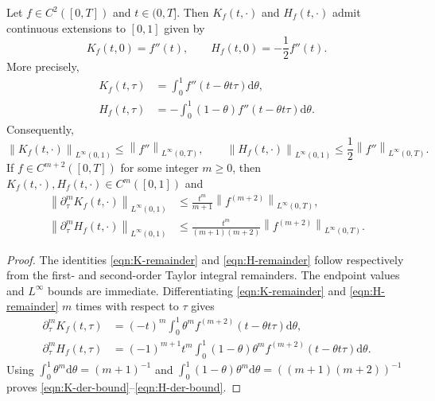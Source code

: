 \documentclass[preprint,3p,times]{elsarticle}
\newcommand{\norm}[1]{\left\lVert #1\right\rVert}
\def\d{\mathrm{d}}
\begin{document}
\begin{lemma}
\label{lem:type-kernels}
Let $f\in C^2([0,T])$ and $t\in(0,T]$. Then $K_f(t,\cdot)$ and $H_f(t,\cdot)$ admit continuous extensions to $[0,1]$ given by
\begin{equation}\label{eqn:K-H-zero}
    K_f(t,0)=f''(t),
    \qquad
    H_f(t,0)=-\frac12 f''(t).
\end{equation}
More precisely,
\begin{align}
    K_f(t,\tau)
    &=\int_0^1 f''(t-\theta t\tau)\d\theta,\label{eqn:K-remainder}\\
    H_f(t,\tau)
    &=-\int_0^1(1-\theta)f''(t-\theta t\tau)\d\theta.\label{eqn:H-remainder}
\end{align}
Consequently,
\begin{equation}\label{eqn:kernel-linf}
    \norm{K_f(t,\cdot)}_{L^\infty(0,1)}\le \norm{f''}_{L^\infty(0,T)},
    \qquad
    \norm{H_f(t,\cdot)}_{L^\infty(0,1)}\le \frac12\norm{f''}_{L^\infty(0,T)}.
\end{equation}
If $f\in C^{m+2}([0,T])$ for some integer $m\ge0$, then $K_f(t,\cdot),H_f(t,\cdot)\in C^m([0,1])$ and
\begin{align}
    \norm{\partial_\tau^m K_f(t,\cdot)}_{L^\infty(0,1)}
    &\le \frac{t^m}{m+1}\norm{f^{(m+2)}}_{L^\infty(0,T)},\label{eqn:K-der-bound}\\
    \norm{\partial_\tau^m H_f(t,\cdot)}_{L^\infty(0,1)}
    &\le \frac{t^m}{(m+1)(m+2)}\norm{f^{(m+2)}}_{L^\infty(0,T)}.\label{eqn:H-der-bound}
\end{align}
\end{lemma}

\begin{proof}
The identities \eqref{eqn:K-remainder} and \eqref{eqn:H-remainder} follow respectively from the first- and second-order Taylor integral remainders. The endpoint values and $L^\infty$ bounds are immediate. Differentiating \eqref{eqn:K-remainder} and \eqref{eqn:H-remainder} $m$ times with respect to $\tau$ gives
\begin{align*}
    \partial_\tau^mK_f(t,\tau)
    &=(-t)^m\int_0^1\theta^m f^{(m+2)}(t-\theta t\tau)\d\theta,\\
    \partial_\tau^mH_f(t,\tau)
    &=(-1)^{m+1}t^m\int_0^1(1-\theta)\theta^m f^{(m+2)}(t-\theta t\tau)\d\theta .
\end{align*}
Using $\int_0^1\theta^m\d\theta=(m+1)^{-1}$ and $\int_0^1(1-\theta)\theta^m\d\theta=((m+1)(m+2))^{-1}$ proves \eqref{eqn:K-der-bound}--\eqref{eqn:H-der-bound}.
\end{proof}
\end{document}
